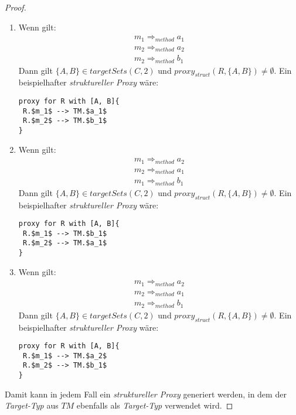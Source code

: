 \begin{proof}
\begin{enumerate}
\item 
Wenn gilt: 
\begin{gather*}
m_1 \Rightarrow_{method} a_1 \\
m_2 \Rightarrow_{method} a_2 \\
m_2 \Rightarrow_{method} b_1
\end{gather*}
Dann gilt $\{A, B\} \in \mathit{targetSets(C,2)}$ und $\mathit{proxy_{struct}(R,\{A, B\})} \neq \emptyset$.
Ein beispielhafter \emph{struktureller Proxy} wäre:
\begin{lstlisting}[mathescape, style=dsl]
proxy for R with [A, B]{
 R.$m_1$ --> TM.$a_1$
 R.$m_2$ --> TM.$b_1$
}
\end{lstlisting}
\item 
Wenn gilt: 
\begin{gather*}
m_1 \Rightarrow_{method} a_2 \\
m_2 \Rightarrow_{method} a_1 \\
m_1 \Rightarrow_{method} b_1
\end{gather*}
Dann gilt $\{A, B\} \in \mathit{targetSets(C,2)}$ und $\mathit{proxy_{struct}(R,\{A, B\})} \neq \emptyset$.
Ein beispielhafter \emph{struktureller Proxy} wäre:
\begin{lstlisting}[mathescape, style=dsl]
proxy for R with [A, B]{
 R.$m_1$ --> TM.$b_1$
 R.$m_2$ --> TM.$a_1$
}
\end{lstlisting}

\item 
Wenn gilt: 
\begin{gather*}
m_1 \Rightarrow_{method} a_2 \\
m_2 \Rightarrow_{method} a_1 \\
m_2 \Rightarrow_{method} b_1
\end{gather*}
Dann gilt $\{A, B\} \in \mathit{targetSets(C,2)}$ und $\mathit{proxy_{struct}(R,\{A, B\})} \neq \emptyset$.
Ein beispielhafter \emph{struktureller Proxy} wäre:
\begin{lstlisting}[mathescape, style=dsl]
proxy for R with [A, B]{
 R.$m_1$ --> TM.$a_2$
 R.$m_2$ --> TM.$b_1$
}
\end{lstlisting}
\end{enumerate}
Damit kann in jedem Fall ein \emph{struktureller Proxy} generiert werden, in dem der \emph{Target-Typ} aus $\mathit{TM}$ ebenfalls als \emph{Target-Typ} verwendet wird.

\end{proof}